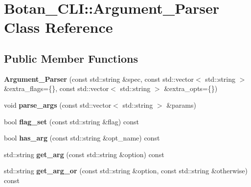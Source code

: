\hypertarget{class_botan___c_l_i_1_1_argument___parser}{}\section{Botan\+\_\+\+C\+LI\+:\+:Argument\+\_\+\+Parser Class Reference}
\label{class_botan___c_l_i_1_1_argument___parser}
\subsection*{Public Member Functions}
\begin{DoxyCompactItemize}
\item 
\mbox{\label{class_botan___c_l_i_1_1_argument___parser_ab7bfdd23724b50742c32d6c4b665afbe}} 
{\bfseries Argument\+\_\+\+Parser} (const std\+::string \&spec, const std\+::vector$<$ std\+::string $>$ \&extra\+\_\+flags=\{\}, const std\+::vector$<$ std\+::string $>$ \&extra\+\_\+opts=\{\})
\item 
\mbox{\label{class_botan___c_l_i_1_1_argument___parser_a110d0250069852806b64e45a37338df9}} 
void {\bfseries parse\+\_\+args} (const std\+::vector$<$ std\+::string $>$ \&params)
\item 
\mbox{\label{class_botan___c_l_i_1_1_argument___parser_a531a63232455cdc4980bbba938eca313}} 
bool {\bfseries flag\+\_\+set} (const std\+::string \&flag) const
\item 
\mbox{\label{class_botan___c_l_i_1_1_argument___parser_afb4ea68bb78817176970cb010021f1c5}} 
bool {\bfseries has\+\_\+arg} (const std\+::string \&opt\+\_\+name) const
\item 
\mbox{\label{class_botan___c_l_i_1_1_argument___parser_afff0526ed09a6c3f7d6586456f087872}} 
std\+::string {\bfseries get\+\_\+arg} (const std\+::string \&option) const
\item 
\mbox{\label{class_botan___c_l_i_1_1_argument___parser_a1c7cd50ac24736ad187b576e472c6bbb}} 
std\+::string {\bfseries get\+\_\+arg\+\_\+or} (const std\+::string \&option, const std\+::string \&otherwise) const

\end{DoxyCompactItemize}
